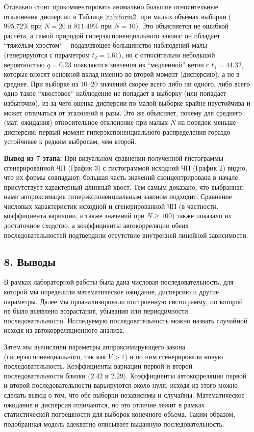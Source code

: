 \documentclass[a4paper,12pt]{article}
\begin{document}
Отдельно стоит прокомментировать аномально большие относительные отклонения дисперсии в Таблице \ref{tab:form2} при малых объёмах выборки ($995.72\%$ при $N=20$ и $811.49\%$ при $N=10$). Это объясняется не ошибкой расчёта, а самой природой гиперэкспоненциального закона: он обладает ``тяжёлым хвостом'' -- подавляющее большинство наблюдений малы (генерируются с параметром $t_2 = 1.61$), но с относительно небольшой вероятностью $q = 0.23$ появляются значения из ``медленной'' ветви с $t_1 = 44.32$, которые вносят основной вклад именно во второй момент (дисперсию), а не в среднее. При выборке из $10$--$20$ значений скорее всего либо ни одного, либо всего одно такое ``хвостовое'' наблюдение не попадает в выборку (или попадает избыточно), из-за чего оценка дисперсии по малой выборке крайне неустойчива и может отличаться от эталонной в разы. Это же объясняет, почему для среднего (мат. ожидания) относительное отклонение при малых $N$ на порядок меньше дисперсии: первый момент гиперэкспоненциального распределения гораздо устойчивее к редким выбросам, чем второй.

\textbf{Вывод из 7 этапа:} При визуальном сравнении полученной гистограммы сгенерированной ЧП (График 3) с гистограммой исходной ЧП (График 2) видно, что их формы совпадают: большая часть значений сконцентрирована в начале, присутствует характерный длинный хвост. Тем самым доказано, что выбранная нами аппроксимация гиперэкспоненциальным законом подходит. Сравнение числовых характеристик исходной и сгенерированной ЧП (в частности, коэффициента вариации, а также значений при $N \geq 100$) также показало их достаточное сходство, а коэффициенты автокорреляции обеих последовательностей подтвердили отсутствие внутренней линейной зависимости.


\subsection*{8. Выводы}
В рамках лабораторной работы была дана числовая последовательность, для которой мы определили математическое ожидание, дисперсию и другие параметры. Далее мы проанализировали построенную гистограмму, по которой не было выявлено возрастания, убывания или периодичности последовательности. Исследуемую последовательность можно назвать случайной исходя из автокорреляционного анализа. 

Затем мы вычислили параметры аппроксимирующего закона (гиперэкспоненциального, так как $V > 1$) и по ним сгенерировали новую последовательность. Коэффициенты вариации первой и второй последовательности близки ($2.42$ и $2.29$). Коэффициенты автокорреляции первой и второй последовательности варьируются около нуля, исходя из этого можно сделать вывод о том, что обе выборки независимы и случайны. Математическое ожидание и дисперсия отличаются, но это отличие лежит в рамках статистической погрешности для выборок конечного объема. Таким образом, подобранная модель адекватно описывает выданную последовательность.
\end{document}
